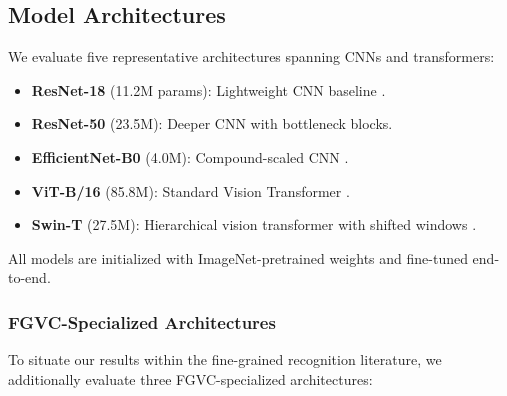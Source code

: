 \documentclass[preprint,review,12pt]{elsarticle}
\begin{document}
\subsection{Model Architectures}
\label{sec:models}

We evaluate five representative architectures spanning CNNs and transformers:

\begin{itemize}
    \item \textbf{ResNet-18} (11.2M params): Lightweight CNN baseline \citep{he2016resnet}.
    \item \textbf{ResNet-50} (23.5M): Deeper CNN with bottleneck blocks.
    \item \textbf{EfficientNet-B0} (4.0M): Compound-scaled CNN \citep{tan2019efficientnet}.
    \item \textbf{ViT-B/16} (85.8M): Standard Vision Transformer \citep{dosovitskiy2021vit}.
    \item \textbf{Swin-T} (27.5M): Hierarchical vision transformer with shifted windows \citep{liu2021swin}.
\end{itemize}

All models are initialized with ImageNet-pretrained \citep{russakovsky2015imagenet} weights and fine-tuned end-to-end.

\subsubsection{FGVC-Specialized Architectures}
\label{sec:fgvc_models}

To situate our results within the fine-grained recognition literature, we additionally evaluate three FGVC-specialized architectures:
\end{document}
